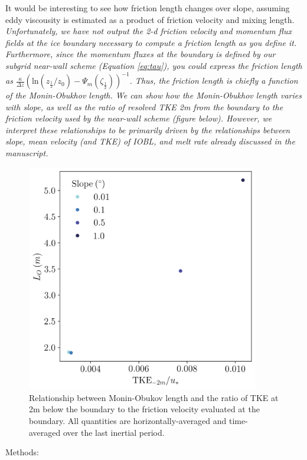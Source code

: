 \documentclass[tc, manuscript]{copernicus}
\begin{document}
It would be interesting to see how friction length changes over slope, assuming eddy viscousity is estimated as a product of friction velocity and mixing length.\\
\textit{Unfortunately, we have not output the 2-d friction velocity and momentum flux fields at the ice boundary necessary to compute a friction length as you define it. Furthermore, since the momentum fluxes at the boundary is defined by our subgrid near-wall scheme (Equation \ref{eq:tau}), you could express the friction length as 
$\frac{\kappa}{\Delta z}(\textrm{ln}\left(z_{\frac{1}{2}}/z_0\right)-\Psi_m\left(\zeta_{\frac{1}{2}}\right))^{-1}$. Thus, the friction length is chiefly a function of the Monin-Obukhov length. We can show how the Monin-Obukhov length varies with slope, as well as the ratio of resolved TKE 2m from the boundary to the friction velocity used by the near-wall scheme (figure below). However, we interpret these relationships to be primarily driven by the relationships between slope, mean velocity (and TKE) of IOBL, and melt rate already discussed in the manuscript.}\vspace{12pt}
\begin{figure}[h!]
    \centering
    \includegraphics[width=4in]{Figures/ol_eres_dslope_t43h_tav13h_fit.png}
    \caption{Relationship between Monin-Obukov length and the ratio of TKE at 2m below the boundary to the friction velocity evaluated at the boundary. All quantities are horizontally-averaged and time-averaged over the last inertial period.}
    \label{fig:R1}
\end{figure}

Methods:\vspace{12pt}
\end{document}

